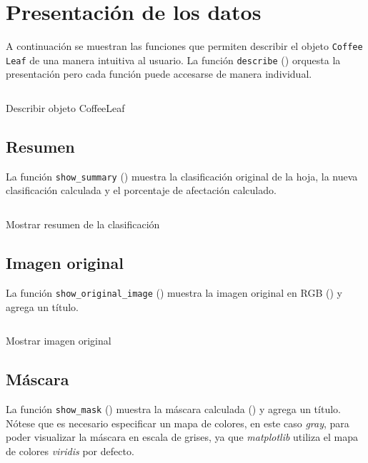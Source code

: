 \section{Presentación de los datos}
A continuación se muestran las funciones que permiten describir el objeto \texttt{Coffee Leaf} de una manera intuitiva al usuario. La función \texttt{describe} () orquesta la presentación pero cada función puede accesarse de manera individual.

\begin{listing}[H]
\inputminted{python}{code_listings/describe.py}
\caption{Describir objeto CoffeeLeaf}
\label{code:describe}
\end{listing}

\subsection{Resumen}
La función \texttt{show\_summary} () muestra la clasificación original de la hoja, la nueva clasificación calculada y el porcentaje de afectación calculado.

\begin{listing}[H]
\inputminted{python}{code_listings/show_summary.py}
\caption{Mostrar resumen de la clasificación}
\label{code:show_summary}
\end{listing}

\subsection{Imagen original}
La función \texttt{show\_original\_image} () muestra la imagen original en \textsf{RGB} () y agrega un título.

\begin{listing}[H]
\inputminted{python}{code_listings/show_original_image.py}
\caption{Mostrar imagen original}
\label{code:show_original_image}
\end{listing}

\subsection{Máscara}
La función \texttt{show\_mask} () muestra la máscara calculada () y agrega un título. Nótese que es necesario especificar un mapa de colores, en este caso \textit{gray}, para poder visualizar la máscara en escala de grises, ya que \textit{matplotlib} utiliza el mapa de colores \textit{viridis} por defecto.

